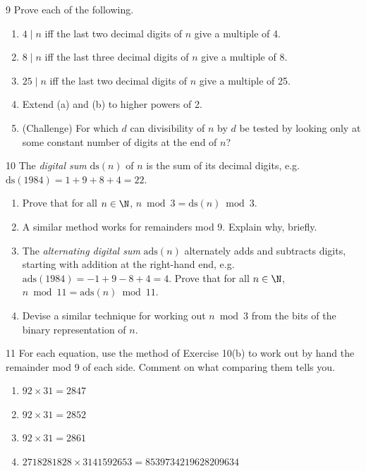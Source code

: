 \begin{exercise}{9}
    Prove each of the following.
    \begin{enumerate}[label=(\alph*)]
        \item $4\mid n$ iff the last two decimal digits of $n$ give a multiple
              of 4.
        \item $8\mid n$ iff the last three decimal digits of $n$ give a multiple
              of 8.
        \item $25\mid n$ iff the last two decimal digits of $n$ give a multiple
              of 25.
        \item Extend (a) and (b) to higher powers of 2.
        \item (Challenge) For which $d$ can divisibility of $n$ by $d$ be tested
              by looking only at some constant number of digits at the end of
              $n$?
    \end{enumerate}
\end{exercise}

\begin{exercise}{10}
    The \emph{digital sum} $\mathrm{ds}(n)$ of $n$ is the sum of its decimal
    digits, e.g.\ $\mathrm{ds}(1984)=1+9+8+4=22$.
    \begin{enumerate}[label=(\alph*)]
        \item Prove that for all $n\in\N$,
              $n\bmod3=\mathrm{ds}(n)\bmod3$.
        \item A similar method works for remainders mod 9. Explain why, briefly.
        \item The \emph{alternating digital sum} $\mathrm{ads}(n)$ alternately
              adds and subtracts digits, starting with addition at the right-hand
              end, e.g.\ $\mathrm{ads}(1984)=-1+9-8+4=4$. Prove that for all
              $n\in\N$, $n\bmod11=\mathrm{ads}(n)\bmod11$.
        \item Devise a similar technique for working out $n\bmod3$ from the bits
              of the binary representation of $n$.
    \end{enumerate}
\end{exercise}

\begin{exercise}{11}
    For each equation, use the method of Exercise 10(b) to work out by hand the
    remainder mod 9 of each side. Comment on what comparing them tells you.
    \begin{enumerate}[label=(\alph*)]
        \item $92\times31=2847$
        \item $92\times31=2852$
        \item $92\times31=2861$
        \item $2718281828\times3141592653=8539734219628209634$
    \end{enumerate}
\end{exercise}

